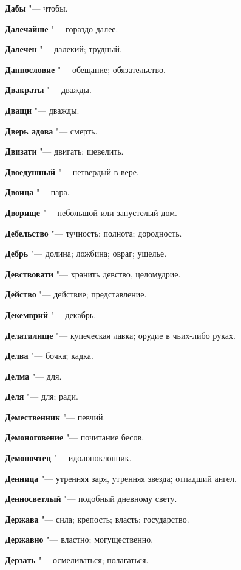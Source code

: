 \begin{mymulticols}
\noindent\textbf{Дабы} "--- чтобы. 

\noindent\textbf{Далечайше} "--- гораздо далее. 

\noindent\textbf{Далечен} "--- далекий; трудный. 

\noindent\textbf{Даннословие} "--- обещание; обязательство. 

\noindent\textbf{Двакраты} "--- дважды. 

\noindent\textbf{Дващи} "--- дважды. 

\noindent\textbf{Дверь адова} "--- смерть. 

\noindent\textbf{Двизати} "--- двигать; шевелить. 

\noindent\textbf{Двоедушный} "--- нетвердый в вере. 

\noindent\textbf{Двоица} "--- пара. 

\noindent\textbf{Дворище} "--- небольшой или запустелый дом. 

\noindent\textbf{Дебельство} "--- тучность; полнота; дородность. 

\noindent\textbf{Дебрь} "--- долина; ложбина; овраг; ущелье. 

\noindent\textbf{Девствовати} "--- хранить девство, целомудрие. 

\noindent\textbf{Действо} "--- действие; представление. 

\noindent\textbf{Декемврий} "--- декабрь. 

\noindent\textbf{Делатилище} "--- купеческая лавка; орудие в чьих-либо руках. 

\noindent\textbf{Делва} "--- бочка; кадка. 

\noindent\textbf{Делма} "--- для. 

\noindent\textbf{Деля} "--- для; ради. 

\noindent\textbf{Демественник} "--- певчий. 

\noindent\textbf{Демоноговение} "--- почитание бесов. 

\noindent\textbf{Демоночтец} "--- идолопоклонник. 

\noindent\textbf{Денница} "--- утренняя заря, утренняя звезда; отпадший ангел. 

\noindent\textbf{Денносветлый} "--- подобный дневному свету. 

\noindent\textbf{Держава} "--- сила; крепость; власть; государство. 

\noindent\textbf{Державно} "--- властно; могущественно. 

\noindent\textbf{Дерзать} "--- осмеливаться; полагаться. 


\end{mymulticols}
